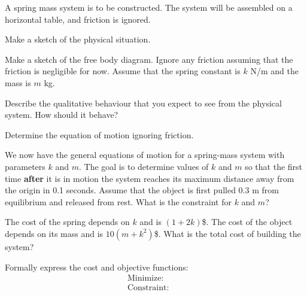 \begin{problem}
\item A spring mass system is to be constructed. The system will be
  assembled on a horizontal table, and friction is ignored. 
  \begin{subproblem}
    \item Make a sketch of the physical situation.
      \vfill
    \item Make a sketch of the free body diagram. Ignore any friction
      assuming that the friction is negligible for now. Assume that
      the spring constant is $k$ N/m and the mass is $m$ kg.
      \vfill
    \item Describe the qualitative behaviour that you expect to see
      from the physical system. How should it behave?
      \vfill
    \item Determine the equation of motion ignoring friction.
      \vfill
  \end{subproblem}

  \clearpage

\item We now have the general equations of motion for a spring-mass
  system with parameters $k$ and $m$. The goal is to determine values
  of $k$ and $m$ so that the first time \textbf{after} it is in motion
  the system reaches its maximum distance away from the origin in 0.1
  seconds. Assume that the object is first pulled 0.3 m from
  equilibrium and released from rest. What is the constraint for $k$
  and $m$?

  \vfill

\item The cost of the spring depends on $k$ and is $(1+2k)$\$. The cost of
  the object depends on its mass and is $10(m+k^2)$\$. What is the
  total cost of building the system?

  \vspace{4em}

\item Formally express the cost and objective functions:
    \begin{eqnarray*}
      \mathrm{Minimize:} & &  \\
      \mathrm{Constraint:} & & 
    \end{eqnarray*}



\end{problem}


\postClass

